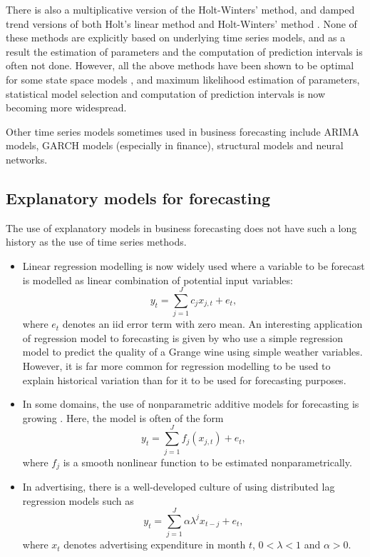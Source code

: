 \documentclass[a4paper,10pt]{article}
\begin{document}
There is also a multiplicative version of the Holt-Winters' method, and damped trend versions of both Holt's linear method and Holt-Winters' method \citep{fpp3}. None of these methods are explicitly based on underlying time series models, and as a result the estimation of parameters and the computation of prediction intervals is often not done. However, all the above methods have  been shown to be optimal for some state space models \citep{expsmooth08}, and maximum likelihood estimation of parameters, statistical model selection and computation of prediction intervals is now becoming more widespread.

Other time series models sometimes used in business forecasting include ARIMA models, GARCH models (especially in finance), structural models and neural networks.

\subsection*{Explanatory models for forecasting}

The use of explanatory models in business forecasting does not have such a long history as the use of time series methods.
\begin{itemize}
	\item Linear regression modelling is now widely used \citep[e.g.,][]{Pardoe06}
	      where a variable to be forecast is modelled as  linear combination of potential input variables:
	      \[
		      y_t = \sum_{j=1}^J c_j x_{j,t} + e_t,
	      \]
	      where $e_t$ denotes an iid error term with zero mean. An interesting application of regression model to forecasting is given by \citet{BA95} who use a simple regression model to predict the quality of a Grange wine using simple weather variables. However, it is far more common for regression modelling to be used to explain historical variation than for it to be used for forecasting purposes.

	\item
	      In some domains, the use of nonparametric additive models for forecasting is growing \citep[e.g.,][]{HF10}. Here, the model is often of the form
	      \[
		      y_t = \sum_{j=1}^J f_j(x_{j,t}) + e_t,
	      \]
	      where $f_j$ is a smooth nonlinear function to be estimated nonparametrically.
	\item In advertising, there is a well-developed culture of using distributed lag regression models \citep[e.g.,][]{HPS01} such as
	      \[
		      y_t = \sum_{j=1}^J \alpha\lambda^j x_{t-j} + e_t,
	      \]
	      where $x_t$ denotes advertising expenditure in month $t$, $0<\lambda<1$ and $\alpha>0$.
\end{itemize}
\end{document}
